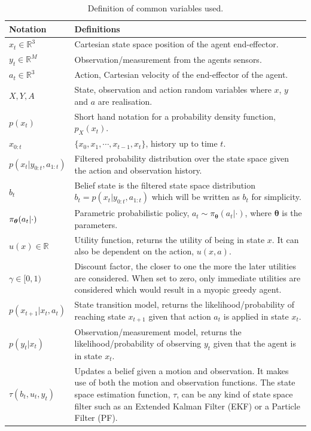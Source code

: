 \begin{table}
\begin{center}
\renewcommand{\arraystretch}{1.5}
\begin{tabular}{|l|p{9cm}|} 
\hline
    \textbf{Notation} 			 	& \textbf{Definitions} \\ \hline\hline
    $x_t \in \mathbb{R}^3$ 		 	& Cartesian state space position of the agent end-effector.\\
    $y_t \in \mathbb{R}^{M}$		 	& Observation/measurement from the agents sensors.\\
    $a_t \in \mathbb{R}^3$		 	& Action, Cartesian velocity of the end-effector of the agent.\\
    $X,Y,A$				 	& State, observation and action random variables where $x$, $y$ and $a$ are realisation.\\
    $p(x_t)$ 					& Short hand notation for a probability density function, $p_{X}(x_t)$.\\
    $x_{0:t}$					& $\{x_0,x_1,\cdots,x_{t-1},x_t\}$, history up to time $t$.\\
    $p(x_t|y_{0:t},a_{1:t})$	 		& Filtered probability distribution over the state space given the action and observation history.\\
    $b_t$					& Belief state is the filtered state space distribution
						 $b_t = p(x_t|y_{0:t},a_{1:t})$ which will be written as $b_t$ for simplicity.\\
    $\operatorname{\pi_{\boldsymbol{\theta}}}(a_t|\cdot)$ 			& Parametric probabilistic policy, $a_t \sim \pi_{\boldsymbol{\theta}}(a_t|\cdot)$, where $\boldsymbol{\theta}$ is the parameters.\\
    $u(x) \in \mathbb{R}$			& Utility function, returns the utility of being in state $x$. It can also be dependent on the action, $u(x,a)$.\\
    $\gamma \in [0,1)$				& Discount factor, the closer to one the more the later utilities are considered. When set to zero, only immediate utilities are 
						  considered which would result in a myopic greedy agent.\\
    $p(x_{t+1}|x_t,a_t)$			& State transition model, returns the likelihood/probability of reaching state $x_{t+1}$ given that action $a_t$ is applied in state $x_t$.\\	
    $p(y_t|x_t)$				& Observation/measurement model, returns the likelihood/probability of observing $y_t$ given that the agent is in state $x_t$.\\
    $\tau(b_{t},u_{t},y_t)$		& Updates a belief given a motion and observation. It makes use of both the motion and observation functions. The state space estimation function, $\tau$, can be any kind of state space filter such as an Extended Kalman Filter (EKF) or a Particle Filter (PF).
    \\ \hline
\end{tabular}
\end{center}
\caption{Definition of common variables used.}
\label{tab:notation}
\end{table}


